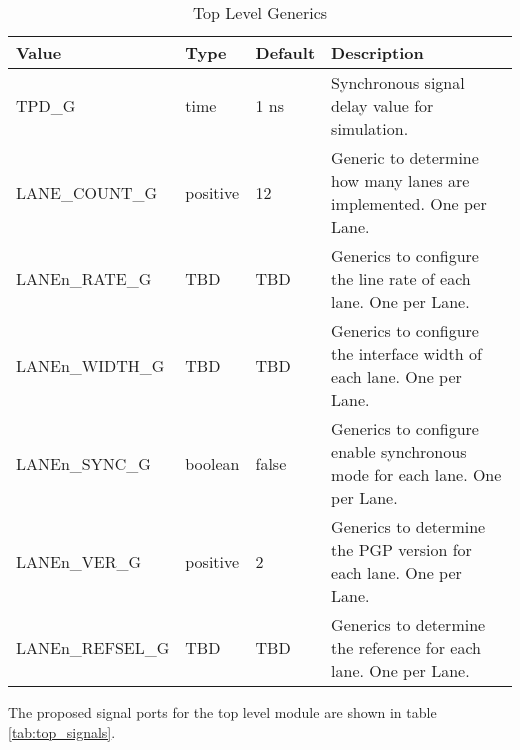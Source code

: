 \documentclass[11pt]{article}
\begin{document}
\begin{table}[H]
\small
\centering
   \begin{tabular}{| l | l | l | l | }
      \hline \textbf{Value} & \textbf{Type} & \textbf{Default} & \textbf{Description} \\
      \hline TPD\_G                  & time    & 1 ns  & Synchronous signal delay value for simulation.       \\
      \hline LANE\_COUNT\_G     & positive & 12    & Generic to determine how many lanes are implemented. One per Lane.\\
      \hline LANEn\_RATE\_G    & TBD      & TBD   & Generics to configure the line rate of each lane. One per Lane.\\
      \hline LANEn\_WIDTH\_G   & TBD      & TBD   & Generics to configure the interface width of each lane. One per Lane.\\
      \hline LANEn\_SYNC\_G    & boolean  & false & Generics to configure enable synchronous mode for each lane. One per Lane.\\
      \hline LANEn\_VER\_G     & positive & 2     & Generics to determine the PGP version for each lane. One per Lane.\\
      \hline LANEn\_REFSEL\_G  & TBD      & TBD   & Generics to determine the reference for each lane. One per Lane.\\
      \hline
   \end{tabular}
   \caption{Top Level Generics}
   \label{tab:top_generics}
\end{table}

The proposed signal ports for the top level module are shown in table \ref{tab:top_signals}.
\end{document}
